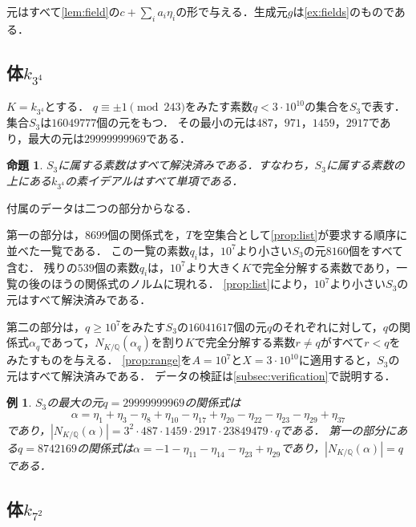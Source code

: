 \documentclass[11pt,a4paper]{ltjsarticle}
\makeatletter
\theoremstyle{ja}
\newtheorem{proposition}[theorem]{命題}
\newtheorem{example}[theorem]{例}
\renewenvironment{proof}[1][証明]{\par
  \pushQED{\qed}\normalfont \topsep6\p@\@plus6\p@\relax
  \trivlist
  \item[\hskip\labelsep\bfseries #1]\hspace{1\zw}\ignorespaces
}{\popQED\endtrivlist\@endpefalse}
\makeatother
\begin{document}
元はすべて\cref{lem:field}の$c + \sum_i a_i \eta_i$の形で与える．生成元$g$は\cref{ex:fields}のものである．

\subsection{体$k_{3^4}$}

$K = k_{3^4}$とする．
$q \equiv \pm 1 \pmod{243}$をみたす素数$q < 3 \cdot 10^{10}$の集合を$S_3$で表す．
集合$S_3$は$16049777$個の元をもつ．
その最小の元は$487$，$971$，$1459$，$2917$であり，最大の元は$29999999969$である．

\begin{proposition} \label{prop:data3}
$S_3$に属する素数はすべて解決済みである．すなわち，$S_3$に属する素数の上にある$k_{3^4}$の素イデアルはすべて単項である．
\end{proposition}

\begin{proof}
付属のデータは二つの部分からなる．

第一の部分は，$8699$個の関係式を，$T$を空集合として\cref{prop:list}が要求する順序に並べた一覧である．
この一覧の素数$q_i$は，$10^7$より小さい$S_3$の元$8160$個をすべて含む．
残りの$539$個の素数$q_i$は，$10^7$より大きく$K$で完全分解する素数であり，一覧の後のほうの関係式のノルムに現れる．
\cref{prop:list}により，$10^7$より小さい$S_3$の元はすべて解決済みである．

第二の部分は，$q \ge 10^7$をみたす$S_3$の$16041617$個の元$q$のそれぞれに対して，$q$の関係式$\alpha_q$であって，$N_{K/\mathbb{Q}}(\alpha_q)$を割り$K$で完全分解する素数$r \ne q$がすべて$r < q$をみたすものを与える．
\cref{prop:range}を$A = 10^7$と$X = 3 \cdot 10^{10}$に適用すると，$S_3$の元はすべて解決済みである．
データの検証は\cref{subsec:verification}で説明する．
\end{proof}

\begin{example} \label{ex:relations}
$S_3$の最大の元$q = 29999999969$の関係式は
\[
\alpha = \eta_1 + \eta_3 - \eta_8 + \eta_{10} - \eta_{17} + \eta_{20} - \eta_{22} - \eta_{23} - \eta_{29} + \eta_{37}
\]
であり，$|N_{K/\mathbb{Q}}(\alpha)| = 3^2 \cdot 487 \cdot 1459 \cdot 2917 \cdot 23849479 \cdot q$である．
第一の部分にある$q = 8742169$の関係式は$\alpha = -1 - \eta_{11} - \eta_{14} - \eta_{23} + \eta_{29}$であり，$|N_{K/\mathbb{Q}}(\alpha)| = q$である．
\end{example}

\subsection{体$k_{7^2}$}
\end{document}
